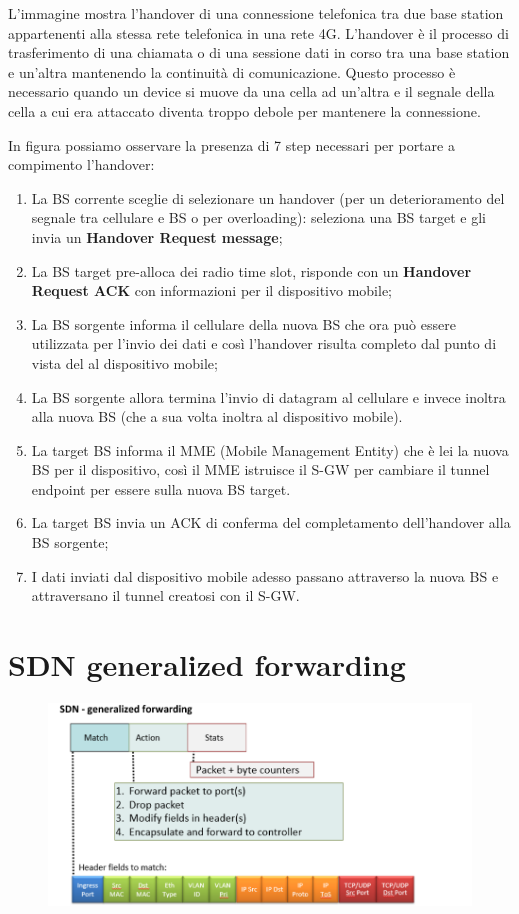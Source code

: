 L'immagine mostra l'handover di una connessione telefonica tra due base station appartenenti alla stessa rete telefonica in una rete 4G. L'handover è il processo di trasferimento di una chiamata o di una sessione dati in corso tra una base station e un'altra mantenendo la continuità di comunicazione. Questo processo è necessario quando un device si muove da una cella ad un'altra e il segnale della cella a cui era attaccato diventa troppo debole per mantenere la connessione.

In figura possiamo osservare la presenza di 7 step necessari per portare a compimento l'handover:

\begin{enumerate}
\item La BS corrente sceglie di selezionare un handover (per un deterioramento del segnale tra cellulare e BS o per overloading): seleziona una BS target e gli invia un \textbf{Handover Request message};
\item La BS target pre-alloca dei radio time slot, risponde con un \textbf{Handover Request ACK} con informazioni per il dispositivo mobile;
\item La BS sorgente informa il cellulare della nuova BS che ora può essere utilizzata per l'invio dei dati e così l'handover risulta completo dal punto di vista del al dispositivo mobile;
\item La BS sorgente allora termina l'invio di datagram al cellulare e invece inoltra alla nuova BS (che a sua volta inoltra al dispositivo mobile).
\item La target BS informa il MME (Mobile Management Entity) che è lei la nuova BS per il dispositivo, così il MME istruisce il S-GW per cambiare il tunnel endpoint per essere sulla nuova BS target.
\item La target BS invia un ACK di conferma del completamento dell'handover alla BS sorgente;
\item I dati inviati dal dispositivo mobile adesso passano attraverso la nuova BS e attraversano il tunnel creatosi con il S-GW.
\end{enumerate}

\section{SDN generalized forwarding}

\begin{figure}[htbp]
   \centering
   \includegraphics{images/questions/Schermata del 2023-11-02 11-34-36.png}
   \label{fig:dom2.7}
\end{figure}

